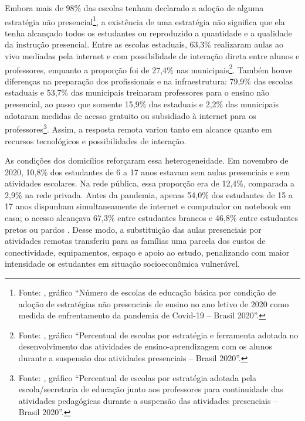 \documentclass[
	12pt,				%
	openright,			%
	oneside,			%
	a4paper,			%
	brazil,				%
	]{article}
\begin{document}
Embora mais de 98\% das escolas tenham declarado a adoção de alguma estratégia
não presencial\footnote{Fonte: \textcite[6]{INEP2021_Covid19CensoEscolar2020},
gráfico ``Número de escolas de educação básica por condição de adoção de
estratégias não presenciais de ensino no ano letivo de 2020 como medida de
enfrentamento da pandemia de Covid-19 -- Brasil 2020''.}, a existência de uma estratégia não significa que ela tenha
alcançado todos os estudantes ou reproduzido a quantidade e a qualidade da
instrução presencial. Entre as escolas estaduais, 63,3\% realizaram aulas ao
vivo mediadas pela internet e com possibilidade de interação direta entre
alunos e professores, enquanto a proporção foi de 27,4\% nas
municipais\footnote{Fonte: \textcite[10]{INEP2021_Covid19CensoEscolar2020},
gráfico ``Percentual de escolas por estratégia e ferramenta adotada no
desenvolvimento das atividades de ensino-aprendizagem com os alunos durante a
suspensão das atividades presenciais -- Brasil 2020''.}. Também houve
diferenças na preparação dos profissionais e na infraestrutura: 79,9\% das
escolas estaduais e 53,7\% das municipais treinaram professores para o ensino
não presencial, ao passo que somente 15,9\% das estaduais e 2,2\% das municipais
adotaram medidas de acesso gratuito ou subsidiado à internet para os
professores\footnote{Fonte: \textcite[8]{INEP2021_Covid19CensoEscolar2020}, gráfico
``Percentual de escolas por estratégia adotada pela escola/secretaria de
educação junto aos professores para continuidade das atividades pedagógicas
durante a suspensão das atividades presenciais -- Brasil 2020''.}. Assim, a resposta remota variou tanto
em alcance quanto em recursos tecnológicos e possibilidades de interação.

As condições dos domicílios reforçaram essa heterogeneidade. Em novembro de
2020, 10,8\% dos estudantes de 6 a 17 anos estavam sem aulas presenciais e sem
atividades escolares. Na rede pública, essa proporção era de 12,4\%, comparada a
2,9\% na rede privada. Antes da pandemia, apenas 54,0\% dos estudantes de 15 a
17 anos dispunham simultaneamente de internet e computador ou notebook em casa;
o acesso alcançava 67,3\% entre estudantes brancos e 46,8\% entre estudantes
pretos ou pardos \cite{IBGE2021_SinteseIndicadoresSociais}. Desse modo, a
substituição das aulas presenciais por atividades remotas transferiu para as
famílias uma parcela dos custos de conectividade, equipamentos, espaço e apoio
ao estudo, penalizando com maior intensidade os estudantes em situação
socioeconômica vulnerável.
\end{document}
